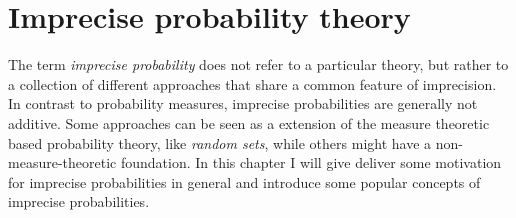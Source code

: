 \documentclass[
]{report}
\theoremstyle{definition}
\theoremstyle{definition}
\begin{document}
\section{Imprecise probability theory}

The term \textit{imprecise probability} does not refer to a particular
theory, but rather to a collection of different approaches that share a
common feature of imprecision. In contrast to probability measures,
imprecise probabilities are generally not additive. Some approaches can
be seen as a extension of the measure theoretic based probability
theory, like \textit{random sets}, while others might have a
non-measure-theoretic foundation. In this chapter I will give deliver
some motivation for imprecise probabilities in general and introduce
some popular concepts of imprecise probabilities.
\end{document}
